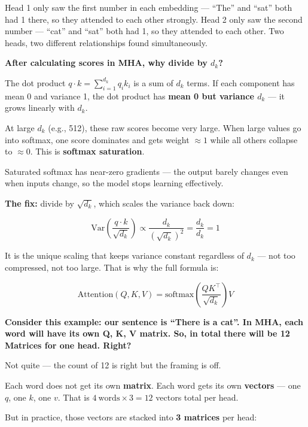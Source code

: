 Head 1 only saw the first number in each embedding --- ``The'' and ``sat'' both had 1 there, so they attended to each other strongly. Head 2 only saw the second number --- ``cat'' and ``sat'' both had 1, so they attended to each other. Two heads, two different relationships found simultaneously.

\bigskip

\textbf{After calculating scores in MHA, why divide by $d_k$?}

The dot product $q \cdot k = \sum_{i=1}^{d_k} q_i k_i$ is a sum of $d_k$ terms. If each component has mean 0 and variance 1, the dot product has \textbf{mean 0 but variance $d_k$} --- it grows linearly with $d_k$.

At large $d_k$ (e.g., 512), these raw scores become very large. When large values go into softmax, one score dominates and gets weight $\approx 1$ while all others collapse to $\approx 0$. This is \textbf{softmax saturation}.

Saturated softmax has near-zero gradients --- the output barely changes even when inputs change, so the model stops learning effectively.

\textbf{The fix:} divide by $\sqrt{d_k}$, which scales the variance back down:

\[
\text{Var}\!\left(\frac{q \cdot k}{\sqrt{d_k}}\right) \propto \frac{d_k}{(\sqrt{d_k})^2} = \frac{d_k}{d_k} = 1
\]

It is the unique scaling that keeps variance constant regardless of $d_k$ --- not too compressed, not too large. That is why the full formula is:

\[
\text{Attention}(Q, K, V) = \text{softmax}\!\left(\frac{QK^\top}{\sqrt{d_k}}\right)V
\]

\bigskip

\textbf{Consider this example: our sentence is ``There is a cat''. In MHA, each word will have its own Q, K, V matrix. So, in total there will be 12 Matrices for one head. Right?}

Not quite --- the count of 12 is right but the framing is off.

Each word does not get its own \textbf{matrix}. Each word gets its own \textbf{vectors} --- one $q$, one $k$, one $v$. That is $4\ \text{words} \times 3 = 12$ vectors total per head.

But in practice, those vectors are stacked into \textbf{3 matrices} per head:


